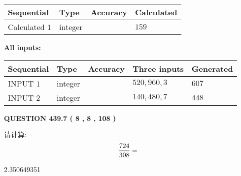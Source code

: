 \documentclass{ctexart}
\begin{document}
   
   
   
\noindent{}
   
   
  
  
\noindent\begin{tabular}{|l|l|l|l|}
\hline
 Sequential & Type & Accuracy & Calculated \\ 
\hline
 
 
  Calculated $  1 $ & integer &  & 
  $ 159 $ 
 \\  \hline  
 \end{tabular}
   
   
   
   
\noindent\vspace{0.1in}\hspace{-0.08in} {\textbf{\Large{All inputs: }}}
   
   
  
  
\noindent\begin{tabular}{|l|l|l|l|l|}
\hline
 Sequential & Type & Accuracy & Three inputs & Generated \\ 
\hline
 
 
  INPUT $  1 $ & integer &  & $
 520
 , 
 960
 , 
 3
 $ & $ 607 $ 
 \\  \hline  
 
 
  INPUT $  2 $ & integer &  & $
 140
 , 
 480
 , 
 7
 $ & $ 448 $ 
 \\  \hline  
 \end{tabular}
   
   
  
\vspace{0.2in}
  
{\textbf{\Large{QUESTION
439.7 
 ( 8 , 8 , 108 )
}}}
  
  
 
请计算:
\begin{equation}
\frac { %
724 }  {  %
308} = \nonumber
\end{equation}
 
 
 
\noindent{}
 
 

2.350649351
 
 
\noindent{}
 
 

 
 
 
\noindent{}
 
\end{document}
